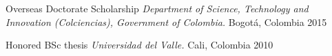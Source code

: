 




\begin{cvhonors}

\cvhonor
{Overseas Doctorate Scholarship} %
{\emph{Department of Science, Technology and Innovation 
 (Colciencias), Government of Colombia.}} %
{Bogotá, Colombia} %
{2015} %


\cvhonor
{Honored BSc thesis} %
{\emph{Universidad del Valle.}} %
{Cali, Colombia} %
{2010} %


\end{cvhonors}
